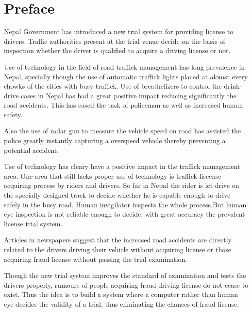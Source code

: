 \section*{Preface}
Nepal Government has introduced a new trial system for providing license to drivers. Traffic authorities present at the trial venue decide on the basis of inspection whether the driver is qualified to acquire a driving license or not.

Use of technology in the field of road traffick management has long prevalence in Nepal, specially though the use of automatic traffick lights placed at alomst every chowks of the cities with busy traffick. Use of breathelizers to control the drink-drive cases in Nepal has had a great positive impact reducing significantly the road accidents. This has eased the task of policeman as well as increased human safety. 


Also the use of radar gun to measure the vehicle speed on road has assisted the police greatly instantly capturing a overspeed vehicle thereby preventing a potential accident. 


Use of technology has cleary have a positive impact in the traffick management area. One area that still lacks proper use of technology is traffick liscense acquiring process by riders and drivers. So far in Nepal the rider is let drive on the specially designed track to decide whether he is capable enough to drive safely in the busy road. Human invigilator inspects the whole process.But human eye inspection is not reliable enough to decide, with great accuracy the prevalent license trial system.


Articles in newspapers suggest that the increased road accidents are directly related to the drivers driving their vehicle without acquiring license or those acquiring fraud license without passing the trial examination.


Though the new trial system improves the standard of examination and tests the drivers properly, rumours of people acquiring fraud driving license do not cease to exist. Thus the idea is to build a system where a computer rather than human eye decides the validity of a trial, thus eliminating the chances of fraud license.


